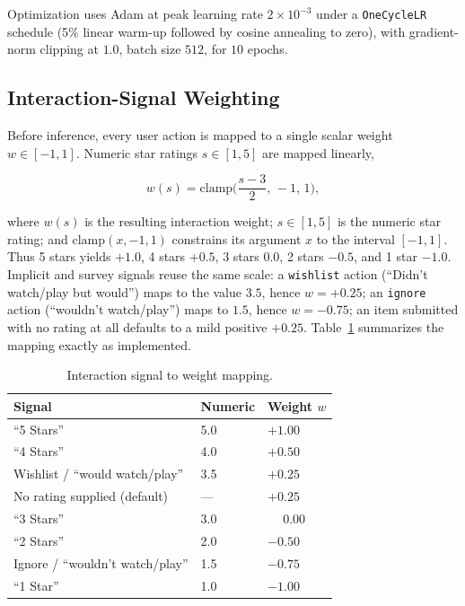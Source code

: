 Optimization uses Adam at peak learning rate $2\times10^{-3}$ under a \texttt{OneCycleLR} schedule (5\% linear warm-up followed by cosine annealing to zero), with gradient-norm clipping at $1.0$, batch size $512$, for $10$ epochs.

\subsection{Interaction-Signal Weighting}
\label{sec:signal_weighting}
Before inference, every user action is mapped to a single scalar weight $w \in [-1, 1]$. Numeric star ratings $s \in [1,5]$ are mapped linearly,

\begin{equation}
w(s) = \mathrm{clamp}\!\Big(\frac{s-3}{2},\,-1,\,1\Big),
\label{eq:starweight}
\end{equation}

where $w(s)$ is the resulting interaction weight; $s \in [1,5]$ is the numeric star rating; and $\mathrm{clamp}(x,-1,1)$ constrains its argument $x$ to the interval $[-1,1]$. Thus 5 stars yields $+1.0$, 4 stars $+0.5$, 3 stars $0.0$, 2 stars $-0.5$, and 1 star $-1.0$. Implicit and survey signals reuse the same scale: a \texttt{wishlist} action (``Didn't watch/play but would'') maps to the value $3.5$, hence $w = +0.25$; an \texttt{ignore} action (``wouldn't watch/play'') maps to $1.5$, hence $w = -0.75$; an item submitted with no rating at all defaults to a mild positive $+0.25$. Table~\ref{tab:signal_weights} summarizes the mapping exactly as implemented.

\begin{table}[H]
    \centering
    \caption{Interaction signal to weight mapping.}
    \label{tab:signal_weights}
    \begin{tabular}{|l|l|l|}
        \hline
        \textbf{Signal} & \textbf{Numeric} & \textbf{Weight $w$} \\ \hline
        ``5 Stars'' & 5.0 & $+1.00$ \\ \hline
        ``4 Stars'' & 4.0 & $+0.50$ \\ \hline
        Wishlist / ``would watch/play'' & 3.5 & $+0.25$ \\ \hline
        No rating supplied (default) & --- & $+0.25$ \\ \hline
        ``3 Stars'' & 3.0 & $\phantom{+}0.00$ \\ \hline
        ``2 Stars'' & 2.0 & $-0.50$ \\ \hline
        Ignore / ``wouldn't watch/play'' & 1.5 & $-0.75$ \\ \hline
        ``1 Star'' & 1.0 & $-1.00$ \\ \hline
    \end{tabular}
\end{table}

